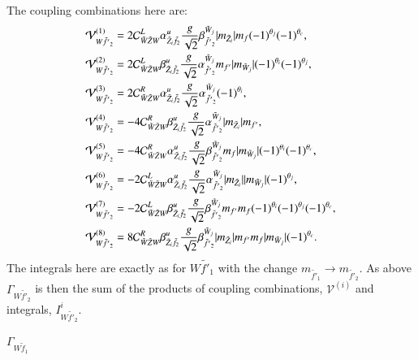 \documentclass[final,3p,times]{elsarticle}
\begin{document}
The coupling combinations here are:
\begin{align}
\mathcal{V}_{W \tilde{f'}_2}^{(1)} &= 2 \mathcal{C}_{\tilde{W} \tilde{Z} W}^L \alpha_{\tilde{Z}_i \tilde{f}_2}^{u} {g \over \sqrt{2}} \beta_{\tilde{f'}_2}^{\tilde{W}_j} |m_{\tilde{Z}_i}| m_{f}(-1)^{\theta_j}(-1)^{\theta_c}, \\
\mathcal{V}_{W \tilde{f'}_2}^{(2)} &= 2 \mathcal{C}_{\tilde{W} \tilde{Z} W}^L \beta_{\tilde{Z}_i \tilde{f}_2}^{u} {g \over \sqrt{2}} \alpha_{\tilde{f'}_2}^{\tilde{W}_j} m_{f'}|m_{\tilde{W}_j}|(-1)^{\theta_i}(-1)^{\theta_j}, \\
\mathcal{V}_{W \tilde{f'}_2}^{(3)} &= 2 \mathcal{C}_{\tilde{W} \tilde{Z} W}^R \alpha_{\tilde{Z}_i \tilde{f}_2}^{u} {g \over \sqrt{2}} \alpha_{\tilde{f'}_2}^{\tilde{W}_j}(-1)^{\theta_i}, \\
\mathcal{V}_{W \tilde{f'}_2}^{(4)} &= -4 \mathcal{C}_{\tilde{W} \tilde{Z} W}^R \beta_{\tilde{Z}_i \tilde{f}_2}^{u} {g \over \sqrt{2}} \alpha_{\tilde{f'}_2}^{\tilde{W}_j}|m_{\tilde{Z}_i}|m_{f'}, \\
\mathcal{V}_{W \tilde{f'}_2}^{(5)} &= -4 \mathcal{C}_{\tilde{W} \tilde{Z} W}^R \alpha_{\tilde{Z}_i \tilde{f}_2}^{u} {g \over \sqrt{2}} \beta_{\tilde{f'}_2}^{\tilde{W}_j}m_{f}|m_{\tilde{W}_j}|(-1)^{\theta_i}(-1)^{\theta_c}, \\
\mathcal{V}_{W \tilde{f'}_2}^{(6)} &= -2 \mathcal{C}_{\tilde{W} \tilde{Z} W}^L \alpha_{\tilde{Z}_i \tilde{f}_2}^{u} {g \over \sqrt{2}} \alpha_{\tilde{f'}_2}^{\tilde{W}_j} |m_{\tilde{Z}_i}||m_{\tilde{W}_j}|(-1)^{\theta_j}, \\
\mathcal{V}_{W \tilde{f'}_2}^{(7)} &= -2 \mathcal{C}_{\tilde{W} \tilde{Z} W}^L \beta_{\tilde{Z}_i \tilde{f}_2}^{u} {g \over \sqrt{2}} \beta_{\tilde{f'}_2}^{\tilde{W}_j} m_{f'} m_{f} (-1)^{\theta_i}(-1)^{\theta_j} (-1)^{\theta_c}, \\
\mathcal{V}_{W \tilde{f'}_2}^{(8)} &= 8 \mathcal{C}_{\tilde{W} \tilde{Z} W}^R \beta_{\tilde{Z}_i \tilde{f}_2}^{u} {g \over \sqrt{2}} \beta_{\tilde{f'}_2}^{\tilde{W}_j} |m_{\tilde{Z}_i}| m_{f'} m_{f}|m_{\tilde{W}_j}|(-1)^{\theta_c}.
\end{align}
The integrals here are exactly as for $W \tilde{f'}_1$ with the change $m_{\tilde{f'}_1} \rightarrow m_{\tilde{f'}_2}$. As above $\Gamma_{W \tilde{f'}_2}$ is then the sum of the products of coupling combinations, $\mathcal{V}^{(i)}$ and integrals, $I_{W \tilde{f'}_2}^{i}$.

\textbf{\underline{$\Gamma_{W \tilde{f}_1}$}}
\end{document}
